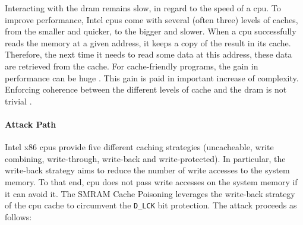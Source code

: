 Interacting with the \ac{dram} remains slow, in regard to the speed of a
\ac{cpu}.
%
To improve performance, Intel \acp{cpu} come with several (often three) levels
of caches, from the smaller and quicker, to the bigger and slower. 
%
When a \ac{cpu} successfully reads the memory at a given address, it keeps a
copy of the result in its cache.
%
Therefore, the next time it needs to read some data at this address, these data are retrieved from the cache.
%
For cache-friendly programs, the gain in performance can be huge .
%
This gain is paid in important increase of complexity. 
%
Enforcing coherence between the different levels of cache and the \ac{dram} is
not trivial .

\paragraph{Attack Path}
%
Intel x86 \acp{cpu} provide five different caching strategies (uncacheable,
write combining, write-through, write-back and write-protected). 
%
In particular, the write-back strategy aims to reduce the number of write
accesses to the system memory.
%
To that end, \ac{cpu} does not pass write accesses on the system memory if it
can avoid it. 
%
The SMRAM Cache Poisoning leverages the write-back strategy of the \ac{cpu}
cache to circumvent the \texttt{D\_LCK} bit protection.
%
The attack proceeds as follows:

